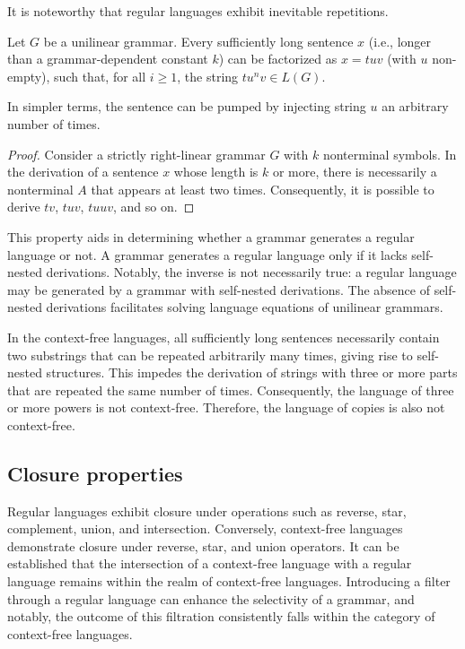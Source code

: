 It is noteworthy that regular languages exhibit inevitable repetitions.
\begin{property}
    Let $G$ be a unilinear grammar. 
    Every sufficiently long sentence $x$ (i.e., longer than a grammar-dependent constant $k$) can be factorized as $x=tuv$ (with $u$ non-empty), such that, for all $i \geq 1$, the string $tu^nv \in L(G)$. 
\end{property}
In simpler terms, the sentence can be pumped by injecting string $u$ an arbitrary number of times.
\begin{proof}
    Consider a strictly right-linear grammar $G$ with $k$ nonterminal symbols. 
    In the derivation of a sentence $x$ whose length is $k$ or more, there is necessarily a nonterminal $A$ that appears at least two times.
    Consequently, it is possible to derive $tv$, $tuv$, $tuuv$, and so on.
\end{proof}
This property aids in determining whether a grammar generates a regular language or not.
A grammar generates a regular language only if it lacks self-nested derivations.
Notably, the inverse is not necessarily true: a regular language may be generated by a grammar with self-nested derivations. 
The absence of self-nested derivations facilitates solving language equations of unilinear grammars.

In the context-free languages, all sufficiently long sentences necessarily contain two substrings that can be repeated arbitrarily many times, giving rise to self-nested structures.
This impedes the derivation of strings with three or more parts that are repeated the same number of times.
Consequently, the language of three or more powers is not context-free. 
Therefore, the language of copies is also not context-free.

\subsection{Closure properties}
Regular languages exhibit closure under operations such as reverse, star, complement, union, and intersection.
Conversely, context-free languages demonstrate closure under reverse, star, and union operators. 
It can be established that the intersection of a context-free language with a regular language remains within the realm of context-free languages.
Introducing a filter through a regular language can enhance the selectivity of a grammar, and notably, the outcome of this filtration consistently falls within the category of context-free languages.